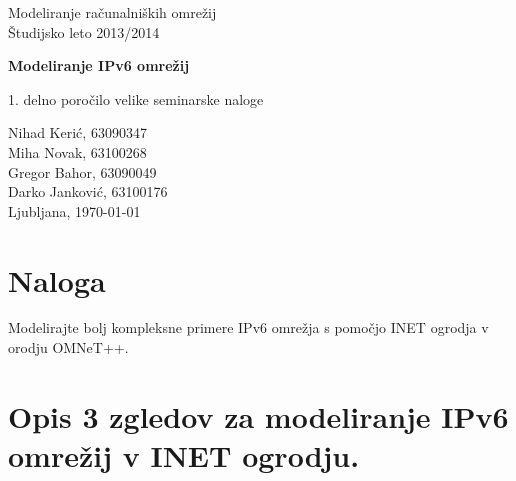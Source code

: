 \documentclass[11pt,a4paper,slovene]{myarticle}
\begin{document}
\label{naslov}
\thispagestyle{empty}

\begin{center}
\begin{Large}
Modeliranje računalniških omrežij\\
Študijsko leto 2013/2014\\
\end{Large}

\vspace*{4cm}
\begin{LARGE}
\textbf{Modeliranje IPv6 omrežij\\}
\end{LARGE}
\vspace*{0.5cm}

\begin{Large}
1. delno poročilo velike seminarske naloge\\

\vspace*{4cm}

Nihad Kerić, 63090347\\
Miha Novak, 63100268\\
Gregor Bahor, 63090049\\
Darko Janković, 63100176\\

\vspace*{5cm}
Ljubljana, \today
\end{Large}
\end{center}

\pagebreak
\setcounter{page}{1}


\label{Kazalo}
\tableofcontents
\thispagestyle{empty}
\pagebreak

\section{Naloga}
Modelirajte bolj kompleksne primere IPv6 omrežja s pomočjo INET ogrodja v orodju OMNeT++. 

\section{Opis 3 zgledov za modeliranje IPv6 omrežij v INET ogrodju.}
\end{document}
